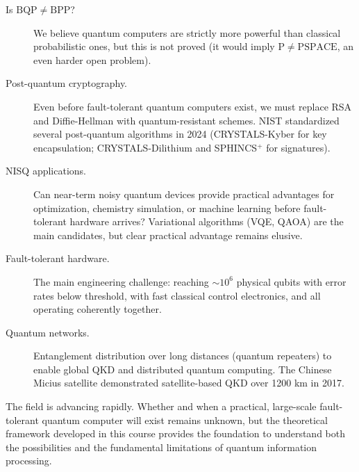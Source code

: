 \documentclass[oneside]{academica}
\begin{document}
\begin{description}
  \item[Is $\mathrm{BQP}\neq\mathrm{BPP}$?]  We believe quantum computers are strictly more powerful than classical probabilistic ones, but this is not proved (it would imply $\mathrm{P}\neq \mathrm{PSPACE}$, an even harder open problem).

  \item[Post-quantum cryptography.] Even before fault-tolerant quantum computers exist, we must replace RSA and Diffie-Hellman with quantum-resistant schemes.
    NIST standardized several post-quantum algorithms in 2024 (CRYSTALS-Kyber for key encapsulation; \newline CRYSTALS-Dilithium and SPHINCS$^+$ for signatures).

  \item[NISQ applications.] Can near-term noisy quantum devices provide practical advantages for optimization, chemistry simulation, or machine learning before fault-tolerant hardware arrives?
    Variational algorithms (VQE, QAOA) are the main candidates, but clear practical advantage remains elusive.

  \item[Fault-tolerant hardware.] The main engineering challenge: reaching $\sim10^6$ physical qubits with error rates below threshold, with fast classical control electronics, and all operating coherently together.

  \item[Quantum networks.] Entanglement distribution over long distances (quantum repeaters) to enable global QKD and distributed quantum computing.
    The Chinese Micius satellite demonstrated satellite-based QKD over 1200 km in 2017.
\end{description}

The field is advancing rapidly.
Whether and when a practical, large-scale fault-tolerant quantum computer will exist remains unknown, but the theoretical framework developed in this course provides the foundation to understand both the possibilities and the fundamental limitations of quantum information processing.
\end{document}
